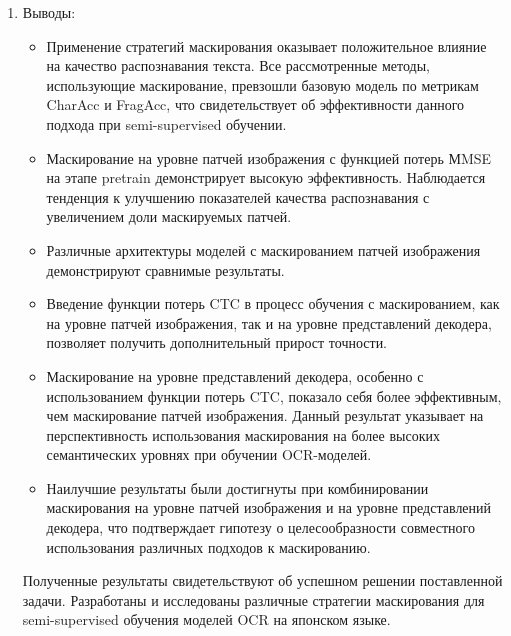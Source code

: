 \begin{enumerate}
   \item Выводы:
   
   \begin{itemize}
     \item Применение стратегий маскирования оказывает положительное влияние на качество распознавания текста. Все рассмотренные методы, использующие маскирование, превзошли базовую модель по метрикам CharAcc и FragAcc, что свидетельствует об эффективности данного подхода при semi-supervised обучении.
     
     \item Маскирование на уровне патчей изображения с функцией потерь МMSE на этапе pretrain демонстрирует высокую эффективность. Наблюдается тенденция к улучшению показателей качества распознавания с увеличением доли маскируемых патчей.
     
     \item Различные архитектуры моделей с маскированием патчей изображения демонстрируют сравнимые результаты.

     \item Введение функции потерь CTC в процесс обучения с маскированием, как на уровне патчей изображения, так и на уровне представлений декодера, позволяет получить дополнительный прирост точности.
     
     \item Маскирование на уровне представлений декодера, особенно с использованием функции потерь CTC, показало себя более эффективным, чем маскирование патчей изображения. Данный результат указывает на перспективность использования маскирования на более высоких семантических уровнях при обучении OCR-моделей.

     \item Наилучшие результаты были достигнуты при комбинировании маскирования на уровне патчей изображения и на уровне представлений декодера, что подтверждает гипотезу о целесообразности совместного использования различных подходов к маскированию.

   \end{itemize}

   Полученные результаты свидетельствуют об успешном решении поставленной задачи. Разработаны и исследованы различные стратегии маскирования для semi-supervised обучения моделей OCR на японском языке. 
\end{enumerate}

\newpage
